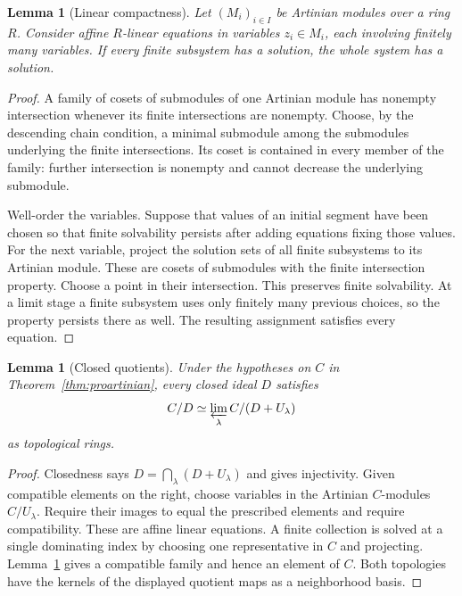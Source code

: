 \documentclass[11pt]{article}
\newtheorem{lemma}[theorem]{Lemma}
\theoremstyle{definition}\newtheorem{definition}[theorem]{Definition}
\theoremstyle{remark}\newtheorem{remark}[theorem]{Remark}
\begin{document}
\begin{lemma}[Linear compactness]\label{lem:compact}
Let $(M_i)_{i\in I}$ be Artinian modules over a ring $R$. Consider affine $R$-linear equations in variables $z_i\in M_i$, each involving finitely many variables. If every finite subsystem has a solution, the whole system has a solution.
\end{lemma}
\begin{proof}
A family of cosets of submodules of one Artinian module has nonempty intersection whenever its finite intersections are nonempty. Choose, by the descending chain condition, a minimal submodule among the submodules underlying the finite intersections. Its coset is contained in every member of the family: further intersection is nonempty and cannot decrease the underlying submodule.

Well-order the variables. Suppose that values of an initial segment have been chosen so that finite solvability persists after adding equations fixing those values. For the next variable, project the solution sets of all finite subsystems to its Artinian module. These are cosets of submodules with the finite intersection property. Choose a point in their intersection. This preserves finite solvability. At a limit stage a finite subsystem uses only finitely many previous choices, so the property persists there as well. The resulting assignment satisfies every equation.
\end{proof}

\begin{lemma}[Closed quotients]\label{lem:quotient}
Under the hypotheses on $C$ in Theorem~\ref{thm:proartinian}, every closed ideal $D$ satisfies
\[
 C/D\simeq\varprojlim_\lambda C/(D+U_\lambda)
\]
as topological rings.
\end{lemma}
\begin{proof}
Closedness says $D=\bigcap_\lambda(D+U_\lambda)$ and gives injectivity. Given compatible elements on the right, choose variables in the Artinian $C$-modules $C/U_\lambda$. Require their images to equal the prescribed elements and require compatibility. These are affine linear equations. A finite collection is solved at a single dominating index by choosing one representative in $C$ and projecting. Lemma~\ref{lem:compact} gives a compatible family and hence an element of $C$. Both topologies have the kernels of the displayed quotient maps as a neighborhood basis.
\end{proof}
\end{document}
